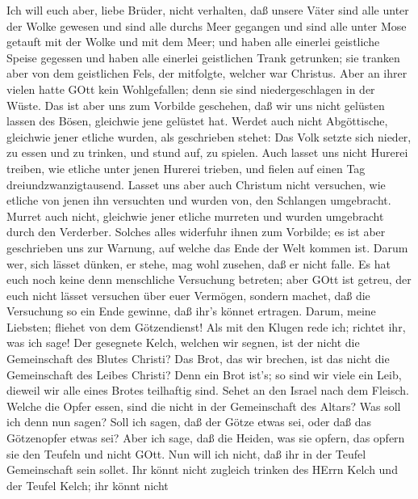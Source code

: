  Ich will euch aber, liebe Brüder, nicht verhalten, daß
unsere Väter sind alle unter der Wolke gewesen und sind alle durchs Meer
gegangen  und sind alle unter Mose getauft mit der Wolke und
mit dem Meer;  und haben alle einerlei geistliche Speise
gegessen  und haben alle einerlei geistlichen Trank
getrunken; sie tranken aber von dem geistlichen Fels, der mitfolgte,
welcher war Christus.  Aber an ihrer vielen hatte GOtt kein
Wohlgefallen; denn sie sind niedergeschlagen in der Wüste. 
Das ist aber uns zum Vorbilde geschehen, daß wir uns nicht gelüsten
lassen des Bösen, gleichwie jene gelüstet hat.  Werdet auch
nicht Abgöttische, gleichwie jener etliche wurden, als geschrieben
stehet: Das Volk setzte sich nieder, zu essen und zu trinken, und stund
auf, zu spielen.  Auch lasset uns nicht Hurerei treiben, wie
etliche unter jenen Hurerei trieben, und fielen auf einen Tag
dreiundzwanzigtausend.  Lasset uns aber auch Christum nicht
versuchen, wie etliche von jenen ihn versuchten und wurden von, den
Schlangen umgebracht.  Murret auch nicht, gleichwie jener
etliche murreten und wurden umgebracht durch den Verderber.
 Solches alles widerfuhr ihnen zum Vorbilde; es ist aber
geschrieben uns zur Warnung, auf welche das Ende der Welt kommen ist.
 Darum wer, sich lässet dünken, er stehe, mag wohl zusehen,
daß er nicht falle.  Es hat euch noch keine denn
menschliche Versuchung betreten; aber GOtt ist getreu, der euch nicht
lässet versuchen über euer Vermögen, sondern machet, daß die Versuchung
so ein Ende gewinne, daß ihr's könnet ertragen.  Darum,
meine Liebsten; fliehet von dem Götzendienst!  Als mit den
Klugen rede ich; richtet ihr, was ich sage!  Der gesegnete
Kelch, welchen wir segnen, ist der nicht die Gemeinschaft des Blutes
Christi? Das Brot, das wir brechen, ist das nicht die Gemeinschaft des
Leibes Christi?  Denn ein Brot ist's; so sind wir viele ein
Leib, dieweil wir alle eines Brotes teilhaftig sind.  Sehet
an den Israel nach dem Fleisch. Welche die Opfer essen, sind die nicht
in der Gemeinschaft des Altars?  Was soll ich denn nun
sagen? Soll ich sagen, daß der Götze etwas sei, oder daß das Götzenopfer
etwas sei?  Aber ich sage, daß die Heiden, was sie opfern,
das opfern sie den Teufeln und nicht GOtt. Nun will ich nicht, daß ihr
in der Teufel Gemeinschaft sein sollet.  Ihr könnt nicht
zugleich trinken des HErrn Kelch und der Teufel Kelch; ihr könnt nicht

